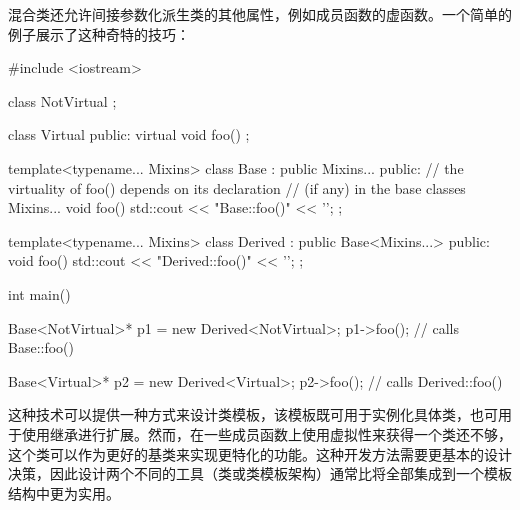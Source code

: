 混合类还允许间接参数化派生类的其他属性，例如成员函数的虚函数。一个简单的例子展示了这种奇特的技巧：

\begin{cpp}
#include <iostream>

class NotVirtual {};

class Virtual {
	public:
	virtual void foo() {
	}
};

template<typename... Mixins>
class Base : public Mixins... {
	public:
	// the virtuality of foo() depends on its declaration
	// (if any) in the base classes Mixins...
	void foo() {
		std::cout << "Base::foo()" << '\n';
	}
};

template<typename... Mixins>
class Derived : public Base<Mixins...> {
	public:
	void foo() {
		std::cout << "Derived::foo()" << '\n';
	}
};

int main() {
	Base<NotVirtual>* p1 = new Derived<NotVirtual>;
	p1->foo(); // calls Base::foo()
	
	Base<Virtual>* p2 = new Derived<Virtual>;
	p2->foo(); // calls Derived::foo()
}
\end{cpp}

这种技术可以提供一种方式来设计类模板，该模板既可用于实例化具体类，也可用于使用继承进行扩展。然而，在一些成员函数上使用虚拟性来获得一个类还不够，这个类可以作为更好的基类来实现更特化的功能。这种开发方法需要更基本的设计决策，因此设计两个不同的工具（类或类模板架构）通常比将全部集成到一个模板结构中更为实用。







